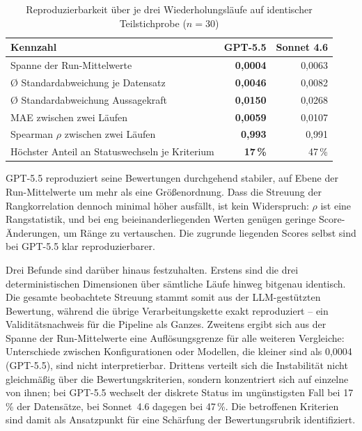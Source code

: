 \begin{table}[H]
    \centering
    \scriptsize
    \renewcommand{\arraystretch}{1.2}
    \begin{tabular}{p{7.4cm}rr}
    \hline
    \textbf{Kennzahl} & \textbf{GPT-5.5} & \textbf{Sonnet 4.6} \\
    \hline
    Spanne der Run-Mittelwerte & \bf{0,0004} & 0,0063 \\
    Ø Standardabweichung je Datensatz & \bf{0,0046} & 0,0082 \\
    Ø Standardabweichung Aussagekraft & \bf{0,0150} & 0,0268 \\
    MAE zwischen zwei Läufen & \bf{0,0059} & 0,0107 \\
    Spearman $\rho$ zwischen zwei Läufen & \bf{0,993} & 0,991 \\
    Höchster Anteil an Statuswechseln je Kriterium & \bf{17\,\%} & 47\,\% \\
    \hline
    \end{tabular}
    \captionsetup{justification=centering}
    \caption[Reproduzierbarkeit über drei Wiederholungsläufe]{Reproduzierbarkeit über je drei Wiederholungsläufe auf identischer Teilstichprobe ($n = 30$)}
    \label{tab:modellauswahl_reproduzierbarkeit}
\end{table}

GPT-5.5 reproduziert seine Bewertungen durchgehend stabiler, auf Ebene der
Run-Mittelwerte um mehr als eine Größenordnung. Dass die Streuung der Rangkorrelation
dennoch minimal höher ausfällt, ist kein Widerspruch: $\rho$ ist eine Rangstatistik, und
bei eng beieinanderliegenden Werten genügen geringe Score-Änderungen, um Ränge zu
vertauschen. Die zugrunde liegenden Scores selbst sind bei GPT-5.5 klar reproduzierbarer.

Drei Befunde sind darüber hinaus festzuhalten. Erstens sind die drei deterministischen
Dimensionen über sämtliche Läufe hinweg bitgenau identisch. Die gesamte beobachtete
Streuung stammt somit aus der LLM-gestützten Bewertung, während die übrige
Verarbeitungskette exakt reproduziert -- ein Validitätsnachweis für die Pipeline als
Ganzes. Zweitens ergibt sich aus der Spanne der Run-Mittelwerte eine Auflösungsgrenze für
alle weiteren Vergleiche: Unterschiede zwischen Konfigurationen oder Modellen, die
kleiner sind als 0,0004 (GPT-5.5), sind nicht interpretierbar. Drittens verteilt sich die
Instabilität nicht gleichmäßig über die Bewertungskriterien, sondern konzentriert sich
auf einzelne von ihnen; bei GPT-5.5 wechselt der diskrete Status im ungünstigsten Fall
bei 17\,\% der Datensätze, bei Sonnet~4.6 dagegen bei 47\,\%. Die betroffenen Kriterien
sind damit als Ansatzpunkt für eine Schärfung der Bewertungsrubrik identifiziert.

